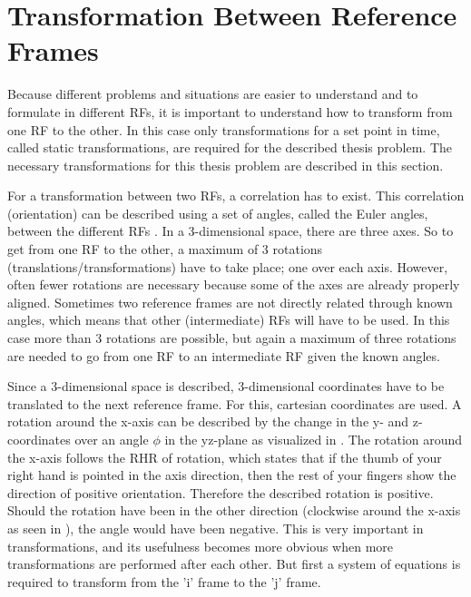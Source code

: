 \section{Transformation Between Reference Frames}
\label{sec:transfram}
Because different problems and situations are easier to understand and to formulate in different \ac{RF}s, it is important to understand how to transform from one \ac{RF} to the other. In this case only transformations for a set point in time, called static transformations, are required for the described thesis problem. The necessary transformations for this thesis problem are described in this section.

For a transformation between two \ac{RF}s, a correlation has to exist. This correlation (orientation) can be described using a set of angles, called the Euler angles, between the different \ac{RF}s \citep{mooij2013stat}. In a 3-dimensional space, there are three axes. So to get from one \ac{RF} to the other, a maximum of 3 rotations (translations/transformations) have to take place; one over each axis. However, often fewer rotations are necessary because some of the axes are already properly aligned. Sometimes two reference frames are not directly related through known angles, which means that other (intermediate) \ac{RF}s will have to be used. In this case more than 3 rotations are possible, but again a maximum of three rotations are needed to go from one \ac{RF} to an intermediate \ac{RF} given the known angles. 

Since a 3-dimensional space is described, 3-dimensional coordinates have to be translated to the next reference frame. For this, cartesian coordinates are used. A rotation around the x-axis can be described by the change in the y- and z-coordinates over an angle $\phi$ in the yz-plane as visualized in . The rotation around the x-axis follows the \ac{RHR} of rotation, which states that if the thumb of your right hand is pointed in the axis direction, then the rest of your fingers show the direction of positive orientation. Therefore the described rotation is positive. Should the rotation have been in the other direction (clockwise around the x-axis as seen in ), the angle would have been negative. This is very important in transformations, and its usefulness becomes more obvious when more transformations are performed after each other. But first a system of equations is required to transform from the 'i' frame to the 'j' frame. 

